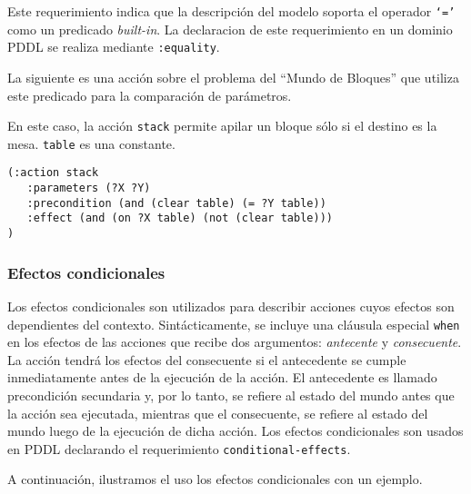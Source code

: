 	Este requerimiento indica que la descripci\'on 
	del modelo soporta el operador \texttt{`='} como un predicado 
	\emph{built-in}.
	La declaracion de este requerimiento en un dominio PDDL se
        realiza mediante  
	\texttt{:equality}. 
	
	La siguiente es una acci\'on sobre el problema del ``Mundo de Bloques'' 
	que utiliza este predicado para la comparaci\'on de par\'ametros.

	\begin{ejemplo}%
        En este caso, la acci\'on \texttt{stack}
        permite apilar un bloque s\'olo si el destino es 
        la mesa. \texttt{table} es una
        constante.
	\begin{verbatim}
(:action stack
   :parameters (?X ?Y)
   :precondition (and (clear table) (= ?Y table)) 
   :effect (and (on ?X table) (not (clear table)))
)                
	\end{verbatim}
	\end{ejemplo}

	\subsubsection{Efectos condicionales}
	
	Los efectos condicionales 
	son utilizados para describir acciones cuyos efectos son 
	dependientes del contexto. 	
	Sint\'acticamente, se incluye una cl\'ausula especial \texttt{when} 
	en los efectos de las acciones que recibe dos argumentos: 
	\emph{antecente} y \emph{consecuente}. 
	La acci\'on tendr\'a los efectos del consecuente si el antecedente 	
	se cumple inmediatamente antes de la ejecuci\'on de la acci\'on. 
	El antecedente es llamado precondici\'on 
	secundaria y, por lo tanto, se refiere al estado del mundo antes 
	que la acci\'on sea ejecutada, mientras que el consecuente, se 
	refiere al estado del mundo luego de la ejecuci\'on de dicha acci\'on.
	Los efectos condicionales son usados en PDDL declarando
	el requerimiento \texttt{conditional-effects}.

	A continuaci\'on, ilustramos el uso los efectos condicionales
        con un ejemplo.

